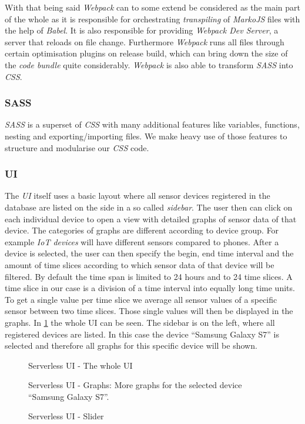 With that being said \textit{Webpack} can to some extend be considered as the main part of the whole
 as it is responsible for orchestrating \textit{transpiling} of
\textit{MarkoJS} files with the help of \textit{Babel}. It is also responsible for providing
\textit{Webpack Dev Server}, a server that reloads on file change. Furthermore \textit{Webpack} runs
all files through certain optimisation plugins on release build, which can bring down the size of
the \textit{code bundle} quite considerably. \textit{Webpack} is also able to transform
\textit{SASS} into \textit{CSS}.

\subsubsection{SASS}

\textit{SASS} \cite{sass} is a superset of \textit{CSS} with many additional features like
variables, functions, nesting and exporting/importing files. We make heavy use of those features to
structure and modularise our \textit{CSS} code.

\subsubsection{UI}

The \textit{UI} itself uses a basic layout where all sensor devices registered in the database are
listed on the side in a so called \textit{sidebar}. The user then can click on each individual
device to open a view with detailed graphs of sensor data of that device. The categories of graphs
are different according to device group. For example \textit{IoT devices} will have different
sensors compared to phones. After a device is selected, the user can then specify the begin, end
time interval and the amount of time slices according to which sensor data of that device will be
filtered. By default the time span is limited to 24 hours and to 24 time slices. A time slice in our
case is a division of a time interval into equally long time units. To get a single value per time
slice we average all sensor values of a specific sensor between two time slices. Those single values
will then be displayed in the graphs. In \ref{fig:ui} the whole UI can be seen. The sidebar is on
the left, where all registered devices are listed. In this case the device “Samsung Galaxy S7” is
selected and therefore all graphs for this specific device will be shown.

\begin{figure}[H]
  \centering
  \caption{Serverless UI - The whole UI}
  \label{fig:ui}
\end{figure}

\begin{figure}[H]
  \centering
  \caption{Serverless UI - Graphs: More graphs for the selected device “Samsung Galaxy S7”.}
\end{figure}

\begin{figure}[H]
  \centering
  \caption{Serverless UI - Slider}
\end{figure}

